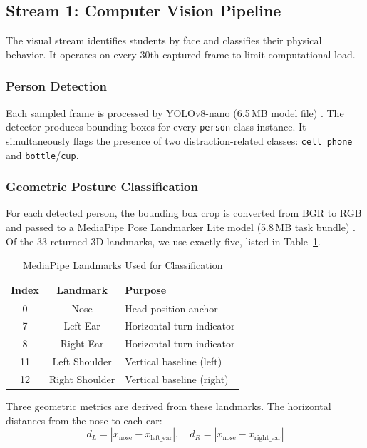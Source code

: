 \documentclass[conference]{IEEEtran}
\begin{document}
\subsection{Stream 1: Computer Vision Pipeline}

The visual stream identifies students by face and classifies their physical behavior. It operates on every 30th captured frame to limit computational load.

\subsubsection{Person Detection}
Each sampled frame is processed by YOLOv8-nano (6.5\,MB model file) \cite{jocher2023}. The detector produces bounding boxes for every \texttt{person} class instance. It simultaneously flags the presence of two distraction-related classes: \texttt{cell phone} and \texttt{bottle}/\texttt{cup}.

\subsubsection{Geometric Posture Classification}
For each detected person, the bounding box crop is converted from BGR to RGB and passed to a MediaPipe Pose Landmarker Lite model (5.8\,MB task bundle) \cite{lugaresi2019}. Of the 33 returned 3D landmarks, we use exactly five, listed in Table~\ref{tab:landmarks}.

\begin{table}[htbp]
\caption{MediaPipe Landmarks Used for Classification}
\begin{center}
\begin{tabular}{|c|c|l|}
\hline
\textbf{Index} & \textbf{Landmark} & \textbf{Purpose} \\
\hline
0 & Nose & Head position anchor \\
7 & Left Ear & Horizontal turn indicator \\
8 & Right Ear & Horizontal turn indicator \\
11 & Left Shoulder & Vertical baseline (left) \\
12 & Right Shoulder & Vertical baseline (right) \\
\hline
\end{tabular}
\label{tab:landmarks}
\end{center}
\end{table}

Three geometric metrics are derived from these landmarks. The horizontal distances from the nose to each ear:
\begin{equation}
d_L = |x_{\text{nose}} - x_{\text{left\_ear}}|, \quad d_R = |x_{\text{nose}} - x_{\text{right\_ear}}|
\label{eq:ear_dist}
\end{equation}
\end{document}
